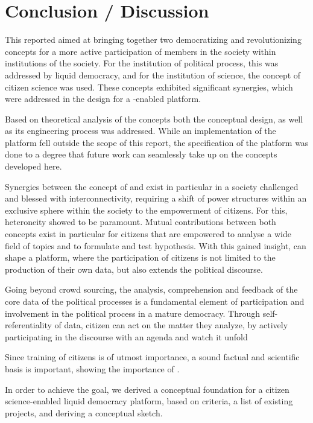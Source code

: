 \chapter{Conclusion / Discussion}
\label{ch:Conclusion}

This reported aimed at bringing together two democratizing and revolutionizing concepts for a more active participation of members in the society within institutions of the society.
For the institution of political process, this was addressed by liquid democracy, and for the institution of science, the concept of citizen science was used.
These concepts exhibited significant synergies, which were addressed in the design for a -enabled  platform. 

Based on theoretical analysis of the concepts both the conceptual design, as well as its engineering process was addressed.
While an implementation of the platform fell outside the scope of this report, the specification of the platform was done to a degree that future work can seamlessly take up on the concepts developed here. 

Synergies between the concept of  and  exist in particular in a society challenged and blessed with interconnectivity, requiring a shift of power structures within an exclusive sphere within the society to the empowerment of citizens.
For this, heteroneity showed to be paramount. 
Mutual contributions between both concepts exist in particular for citizens that are empowered to analyse a wide field of topics and to formulate and test hypothesis.
With this gained insight,  can shape a  platform, where the participation of citizens is not limited to the production of their own data, but also extends the political discourse.

Going beyond crowd sourcing, the analysis, comprehension and feedback of the core data of the political processes is a fundamental element of participation and involvement in the political process in a mature democracy. 
Through self-referentiality of data, citizen  can act on the matter they analyze, by actively participating in the discourse with an agenda and watch it unfold

Since training of citizens is of utmost importance, a sound factual and scientific basis is important, showing the importance of .

In order to achieve the goal, we derived a conceptual foundation for a citizen science-enabled liquid democracy platform, based on criteria, a list of existing projects, and deriving a conceptual sketch.

